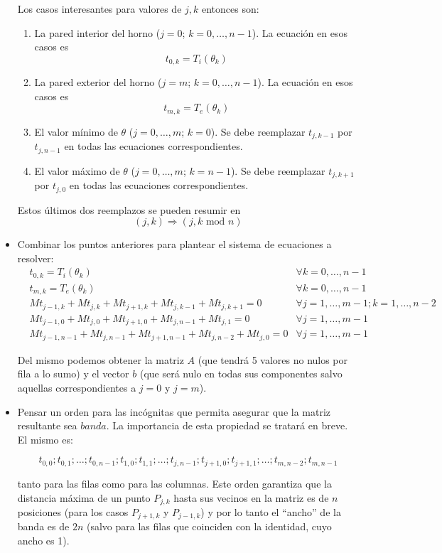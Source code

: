 \begin{itemize}
    Los casos interesantes para valores de $j, k$ entonces son:
    \begin{enumerate}
     \item La pared interior del horno ($j = 0$; $k = 0, \ldots, n-1$). La ecuación en esos casos es $$t_{0, k} = T_i(\theta_k)$$
     \item La pared exterior del horno ($j = m$; $k = 0, \ldots, n-1$). La ecuación en esos casos es $$t_{m, k} = T_e(\theta_k)$$
     \item El valor mínimo de $\theta$ ($j = 0, \ldots, m$; $k = 0$). Se debe reemplazar $t_{j, k-1}$ por $t_{j, n-1}$ en todas las ecuaciones correspondientes.
     \item El valor máximo de $\theta$ ($j = 0, \ldots, m$; $k = n-1$). Se debe reemplazar $t_{j, k+1}$ por $t_{j, 0}$ en todas las ecuaciones correspondientes.
    \end{enumerate}
    Estos últimos dos reemplazos se pueden resumir en $$(j, k) \Rightarrow (j, k \text{ mod } n)$$
 \item
    Combinar los puntos anteriores para plantear el sistema de ecuaciones a resolver:
    \begin{align*}\label{sistema}
    &t_{0, k} = T_i(\theta_k)                                           &\forall k = 0, \ldots, n-1  \\
    &t_{m, k} = T_e(\theta_k)                                           &\forall k = 0, \ldots, n-1  \\
    &Mt_{j-1,k} + Mt_{j,k} + Mt_{j+1,k} + Mt_{j,k-1} + Mt_{j,k+1} = 0  &\forall j=1, \ldots, m-1; k = 1, \ldots , n-2 \\
    &Mt_{j-1,0} + Mt_{j,0} + Mt_{j+1,0} + Mt_{j,n-1} + Mt_{j,1} = 0    &\forall j=1, \ldots, m-1 \\
    &Mt_{j-1,n-1} + Mt_{j,n-1} + Mt_{j+1,n-1} + Mt_{j,n-2} + Mt_{j,0} = 0    &\forall j=1, \ldots, m-1
    \end{align*}

    Del mismo podemos obtener la matriz $A$ (que tendrá 5 valores no nulos por fila a lo sumo) y el vector $b$ (que será nulo en todas sus componentes salvo aquellas correspondientes a $j=0$ y $j=m$).
  \item
    Pensar un orden para las incógnitas que permita asegurar que la matriz resultante sea $banda$. La importancia de esta propiedad se tratará en breve. El mismo es:
    
    $$ t_{0,0}; t_{0,1}; \ldots ; t_{0,n-1}; t_{1,0}; t_{1,1}; \ldots ; t_{j,n-1}; t_{j+1,0}; t_{j+1,1}; \ldots ; t_{m, n-2} ; t_{m, n-1}$$ %
    
    tanto para las filas como para las columnas. Este orden garantiza que la distancia máxima de un punto $P_{j,k}$ hasta sus vecinos en la matriz es de $n$ posiciones (para los casos $P_{j+1, k}$ y $P_{j-1, k}$) y por lo tanto el ``ancho'' de la banda es de $2n$ (salvo para las filas que coinciden con la identidad, cuyo ancho es 1).
    
\end{itemize}

